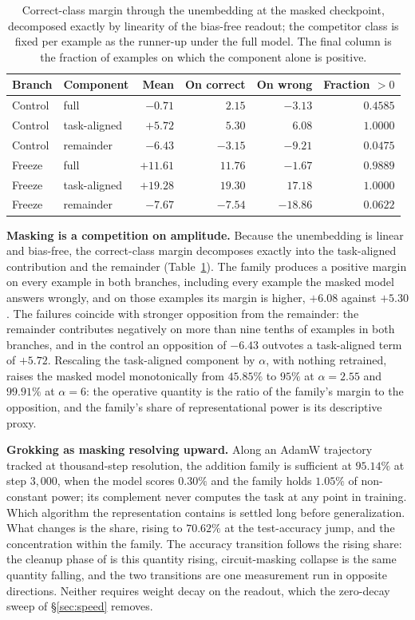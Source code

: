 \documentclass{article}
\begin{document}
\begin{table}[t]
\centering
\caption{Correct-class margin through the unembedding at the masked checkpoint, decomposed exactly by linearity of the bias-free readout; the competitor class is fixed per example as the runner-up under the full model. The final column is the fraction of examples on which the component alone is positive.}
\label{tab:margins}
\begin{tabular}{llrrrr}
\toprule
Branch & Component & Mean & On correct & On wrong & Fraction $>0$ \\
\midrule
Control & full & $-0.71$ & $2.15$ & $-3.13$ & $0.4585$ \\
Control & task-aligned & $+5.72$ & $5.30$ & $6.08$ & $1.0000$ \\
Control & remainder & $-6.43$ & $-3.15$ & $-9.21$ & $0.0475$ \\
\midrule
Freeze & full & $+11.61$ & $11.76$ & $-1.67$ & $0.9889$ \\
Freeze & task-aligned & $+19.28$ & $19.30$ & $17.18$ & $1.0000$ \\
Freeze & remainder & $-7.67$ & $-7.54$ & $-18.86$ & $0.0622$ \\
\bottomrule
\end{tabular}
\end{table}

\textbf{Masking is a competition on amplitude.} Because the unembedding is linear and bias-free, the correct-class margin decomposes exactly into the task-aligned contribution and the remainder (Table~\ref{tab:margins}). The family produces a positive margin on every example in both branches, including every example the masked model answers wrongly, and on those examples its margin is higher, $+6.08$ against $+5.30$. The failures coincide with stronger opposition from the remainder: the remainder contributes negatively on more than nine tenths of examples in both branches, and in the control an opposition of $-6.43$ outvotes a task-aligned term of $+5.72$. Rescaling the task-aligned component by $\alpha$, with nothing retrained, raises the masked model monotonically from $45.85\%$ to $95\%$ at $\alpha=2.55$ and $99.91\%$ at $\alpha=6$: the operative quantity is the ratio of the family's margin to the opposition, and the family's share of representational power is its descriptive proxy.

\textbf{Grokking as masking resolving upward.} Along an AdamW trajectory tracked at thousand-step resolution, the addition family is sufficient at $95.14\%$ at step $3{,}000$, when the model scores $0.30\%$ and the family holds $1.05\%$ of non-constant power; its complement never computes the task at any point in training. Which algorithm the representation contains is settled long before generalization. What changes is the share, rising to $70.62\%$ at the test-accuracy jump, and the concentration within the family. The accuracy transition follows the rising share: the cleanup phase of \citet{nanda2023progress} is this quantity rising, circuit-masking collapse is the same quantity falling, and the two transitions are one measurement run in opposite directions. Neither requires weight decay on the readout, which the zero-decay sweep of \S\ref{sec:speed} removes.
\end{document}
